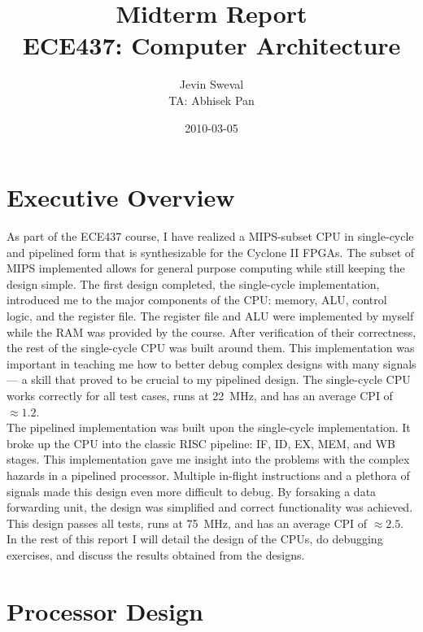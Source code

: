 \documentclass[12pt]{article}
\title{Midterm Report \\
ECE437: Computer Architecture}
\author{Jevin Sweval \\
        TA: Abhisek Pan}
\date{2010-03-05}
\begin{document}
  \maketitle
  \newpage

\section{Executive Overview}
As part of the ECE437 course, I have realized a MIPS-subset CPU in single-cycle and pipelined form that is synthesizable for the Cyclone II FPGAs. The subset of MIPS implemented allows for general purpose computing while still keeping the design simple. The first design completed, the single-cycle implementation, introduced me to the major components of the CPU: memory, ALU, control logic, and the register file. The register file and ALU were implemented by myself while the RAM was provided by the course. After verification of their correctness, the rest of the single-cycle CPU was built around them. This implementation was important in teaching me how to better debug complex designs with many signals --- a skill that proved to be crucial to my pipelined design. The single-cycle CPU works correctly for all test cases, runs at 22~MHz, and has an average CPI of $\approx 1.2$.\\

The pipelined implementation was built upon the single-cycle implementation. It broke up the CPU into the classic RISC pipeline: IF, ID, EX, MEM, and WB stages. This implementation gave me insight into the problems with the complex hazards in a pipelined processor. Multiple in-flight instructions and a plethora of signals made this design even more difficult to debug. By forsaking a data forwarding unit, the design was simplified and correct functionality was achieved. This design passes all tests, runs at 75~MHz, and has an average CPI of $\approx 2.5$. In the rest of this report I will detail the design of the CPUs, do debugging exercises, and discuss the results obtained from the designs.\\

\newpage
\section{Processor Design}
\end{document}
